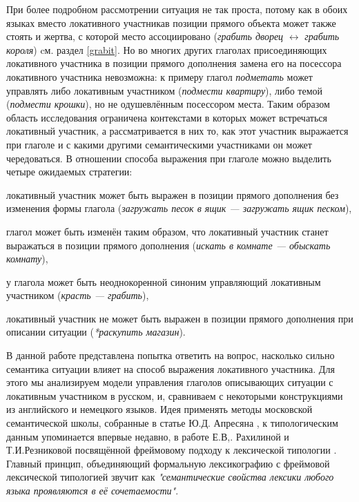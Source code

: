 При более подробном рассмотрении ситуация не так проста, потому как в обоих языках вместо локативного участникав позиции прямого объекта может также стоять и жертва, с которой место ассоциировано (\textit{грабить дворец} $\leftrightarrow$ \textit{грабить короля}) cм. раздел \ref{grabit}. Но во многих других глаголах присоединяющих локативного участника в позиции прямого дополнения замена его на посессора локативного участника невозможна: к примеру глагол \textit{подметать} может управлять либо локативным участником (\textit{подмести квартиру}), либо темой (\textit{подмести крошки}), но не одушевлённым посессором места. Таким образом область исследования ограничена контекстами в которых может встречаться локативный участник, а рассматривается в них то, как этот участник выражается при глаголе и с какими другими семантическими участниками он может чередоваться. В отношении способа выражения при глаголе можно выделить четыре ожидаемых стратегии:
\begin{enumerate*}[label=(\arabic*),itemjoin={\hskip2mm},after=\hskip2mm,before=\hskip2mm]
\item локативный участник может быть выражен в позиции прямого дополнения без изменения формы глагола (\textit{загружать песок в ящик --- загружать ящик песком}),
\item глагол может быть изменён таким образом, что локативный участник станет выражаться в позиции прямого дополнения (\textit{искать в комнате --- обыскать комнату}),
\item у глагола может быть неоднокоренной синоним управляющий локативным участником (\textit{красть --- грабить}),
\item локативный участник не может быть выражен в позиции прямого дополнения при описании ситуации (\textit{*раскупить магазин}).
\end{enumerate*}
В данной работе представлена попытка ответить на вопрос, насколько сильно семантика ситуации влияет на способ выражения локативного участника. Для этого мы анализируем модели управления глаголов описывающих ситуации с локативным участником в русском, и, сравниваем с некоторыми конструкциями из английского и немецкого языков. Идея применять методы московской семантической школы, собранные в статье Ю.Д. Апресяна \citep{апресян2005московской}, к типологическим данным упоминается впервые недавно, в работе Е.В,. Рахилиной и Т.И.Резниковой посвящённой фреймовому подходу к лексической типологии \citep{rakhilina2016frame}. Главный принцип, объединяющий формальную лексикографию с фреймовой лексической типологией звучит как \textit{"семантические
свойства лексики любого языка проявляются в её сочетаемости"}.

